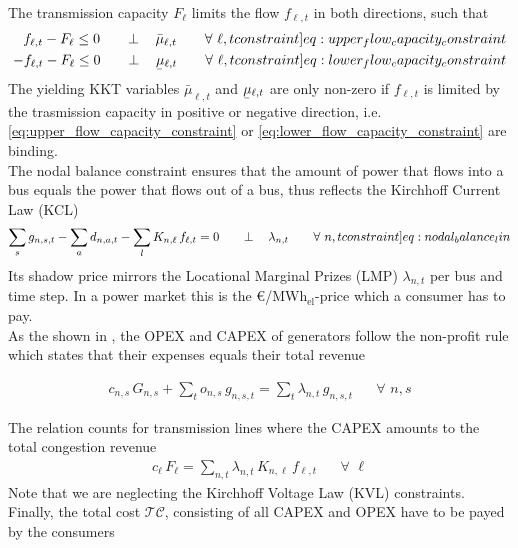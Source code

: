 \documentclass[11pt]{article}
\newcommand{\ubar}[1]{\underaccent{\bar}{#1}}
\newcommand{\generation}{g_{n,s,t}}
\newcommand{\capacityGeneration}{G_{n,s}}
\newcommand{\capacityFlow}{F_{\ell}}
\newcommand{\capexGeneration}{c_{n,s}}
\newcommand{\capexFlow}{c_{\ell}}
\newcommand{\opexGeneration}{o_{n,s}}
\newcommand{\demand}[1][n]{d_{#1,a,t}}
\newcommand{\incidence}{K_{n,\ell}}
\newcommand{\mulowerflow}{\ubar{\mu}_{\ell,t}}
\newcommand{\muupperflow}{\bar{\mu}_{\ell,t}}
\newcommand{\lmp}[1][n]{\lambda_{#1,t}}
\newcommand{\flow}{f_{\ell,t}}
\newcommand{\megawatthour}{MWh$_\text{el}$}
\newcommand{\totalcost}{\mathcal{TC}}
\newcommand{\resultsin}[1]{\hspace{20pt} \bot  \hspace{12pt} #1}
\newcommand{\Forall}[1]{\hspace{20pt} \forall \,\, #1}
\begin{document}
\noindent
The transmission capacity $\capacityFlow$ limits the flow $\flow$ in both directions, such that 
\begin{align}
 \flow - \capacityFlow \le 0 \resultsin{\muupperflow} \Forall{\ell,t} 
 \label[constraint]{eq:upper_flow_capacity_constraint} \\
 - \flow - \capacityFlow \le 0 \resultsin{\mulowerflow} \Forall{\ell,t} 
 \label[constraint]{eq:lower_flow_capacity_constraint}
\end{align}
The yielding KKT variables $\muupperflow$ and $\mulowerflow$ are only non-zero if $\flow$ is limited by the trasmission capacity in positive or negative direction, i.e. \cref{eq:upper_flow_capacity_constraint} or \cref{eq:lower_flow_capacity_constraint} are binding. \\

The nodal balance constraint ensures that the amount of power that flows into a bus equals the power that flows out of a bus, thus reflects the Kirchhoff Current Law (KCL)
\begin{align}
    \sum_s \generation - \sum_a \demand - \sum_l \incidence \, \flow = 0 \resultsin{\lmp} \Forall{n,t}
    \label[constraint]{eq:nodal_balance_lin}
\end{align}
Its shadow price mirrors the Locational Marginal Prizes (LMP) $\lmp$ per bus and time step. In a power market this is the \euro/\megawatthour-price which a consumer has to pay. \\

As the shown in \cite{brown_decreasing_2020}, the OPEX and CAPEX of generators follow the non-profit rule which states that their expenses equals their total revenue 

\begin{align}
\capexGeneration \, \capacityGeneration + \sum_{t} \opexGeneration \, \generation = \sum_{t} \lmp \, \generation \Forall{n,s}\label{eq:non_profit_generator}
\end{align}

\noindent
The relation counts for transmission lines where the CAPEX amounts to the total congestion revenue
\begin{align}
\capexFlow \, \capacityFlow = \sum_{n,t} \lmp \, \incidence \, \flow \Forall{\ell} \label{eq:non_profit_branch}
\end{align}
Note that we are neglecting the Kirchhoff Voltage Law (KVL) constraints. Finally, the total cost $\totalcost$, consisting of all CAPEX and OPEX have to be payed by the consumers 
\end{document}
